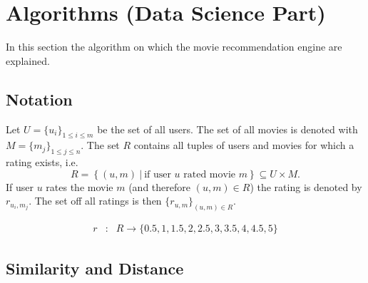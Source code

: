 \documentclass{article}
\begin{document}
\section{Algorithms (Data Science Part)}

In this section the algorithm on which the movie recommendation engine are explained.

\subsection{Notation}

Let $U = \{ u_i \}_{1 \leq i \leq m}$ be the set of all users. The set of all movies is denoted with $M = \{ m_j \}_{1 \leq j \leq n}$. The set $R$ contains all tuples of users and movies for which a rating exists, i.e.
\[ R = \left\{ (u, m)~|~\textrm{if user }u\textrm{ rated movie }m\right\}\subseteq U\times M.\]
If user $u$ rates the movie $m$ (and therefore $(u,m)\in R$)  the rating is denoted by $r_{u_i, m_j}$. The set off all ratings is then $\{ r_{u, m}\}_{(u,m)\in R}$.

\begin{eqnarray}
r &:& R \rightarrow \{0.5, 1, 1.5, 2, 2.5, 3, 3.5, 4, 4.5, 5\}\nonumber
\end{eqnarray}


\subsection{Similarity and Distance}
\end{document}
